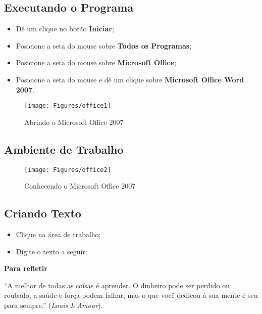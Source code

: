 \documentclass[hidelinks,12pt]{article}
\begin{document}
\subsection{Executando o Programa}

\begin{itemize}
	\item Dê um clique no botão \textbf {Iniciar};

	\item Posicione a seta do mouse sobre \textbf{Todos os Programas};

	\item Posicione a seta do mouse sobre \textbf{Microsoft Office};

	\item Posicione a seta do mouse e dê um clique sobre \textbf{Microsoft Office Word 2007}.
\end{itemize}

\begin{figure}[!h]
	\centering
	\texttt{[image: Figures/office1]}
	\label{fig:office1}
	\caption{Abrindo o Microsoft Office 2007}
\end{figure}


\subsection{Ambiente de Trabalho}

\begin{figure}[!h]
	\centering
	\texttt{[image: Figures/office2]}
	\label{fig:office2}
	\caption{Conhecendo o Microsoft Office 2007}
\end{figure}


\subsection{Criando Texto}

\begin{itemize}
	\item Clique na área de trabalho;

	\item Digite o texto a seguir:
\end{itemize}


{\textbf{\hspace{5cm} Para refletir}}

``A melhor de todas as coisas é aprender. O dinheiro pode ser perdido ou roubado, a saúde e força podem falhar, mas o que você dedicou à sua mente é seu para sempre.'' (\emph{Louis L'Amour}).
\end{document}
